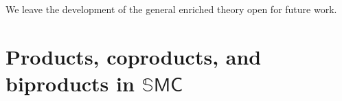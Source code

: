 \documentclass[11pt, oneside, article]{memoir}
\begin{document}
We leave the development of the general enriched theory open for future work.


\newpage
\appendix

\chapter{Products, coproducts, and biproducts in $\mathbb{S}\mathsf{MC}$}\label{chap.proofs}


\newpage
\printbibliography
\end{document}
